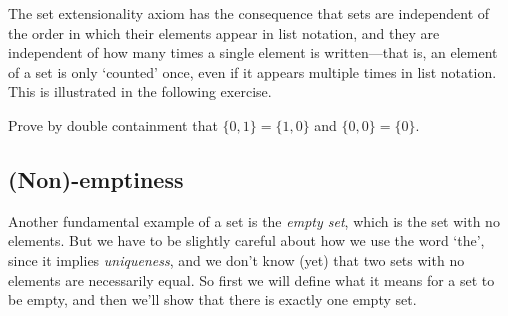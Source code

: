 The set extensionality axiom has the consequence that sets are independent of the order in which their elements appear in list notation, and they are independent of how many times a single element is written---that is, an element of a set is only `counted' once, even if it appears multiple times in list notation. This is illustrated in the following exercise.

\begin{exercise}
Prove by double containment that $\{ 0, 1 \} = \{ 1, 0 \}$ and $\{ 0, 0 \} = \{ 0 \}$.
\end{exercise}

\subsection*{(Non)-emptiness}

Another fundamental example of a set is the \textit{empty set}, which is the set with no elements. But we have to be slightly careful about how we use the word `the', since it implies \textit{uniqueness}, and we don't know (yet) that two sets with no elements are necessarily equal. So first we will define what it means for a set to be empty, and then we'll show that there is exactly one empty set.


